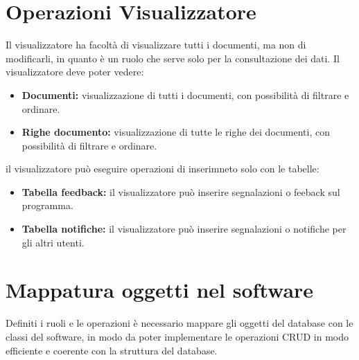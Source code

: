 \documentclass[12pt, a4paper]{article}
\begin{document}
\section{Operazioni Visualizzatore}
Il visualizzatore ha facoltà di visualizzare tutti i documenti, ma non di modificarli, in quanto è un ruolo che serve solo per la consultazione dei dati.
Il visualizzatore deve poter vedere:
\begin{itemize}
    \item \textbf{Documenti:} visualizzazione di tutti i documenti, con possibilità di filtrare e ordinare.
    \item \textbf{Righe documento:} visualizzazione di tutte le righe dei documenti, con possibilità di filtrare e ordinare.
\end{itemize}
il visualizzatore può eseguire operazioni di inserimneto solo con le tabelle:
\begin{itemize}
    \item \textbf{Tabella feedback:} il visualizzatore può inserire segnalazioni o feeback sul programma.
    \item \textbf{Tabella notifiche:} il visualizzatore può inserire segnalazioni o notifiche per gli altri utenti.
\end{itemize}

\section{Mappatura oggetti nel software}
Definiti i ruoli e le operazioni è necessario mappare gli oggetti del database con le classi del software,
in modo da poter implementare le operazioni CRUD in modo efficiente e coerente con la struttura del database.
\end{document}
